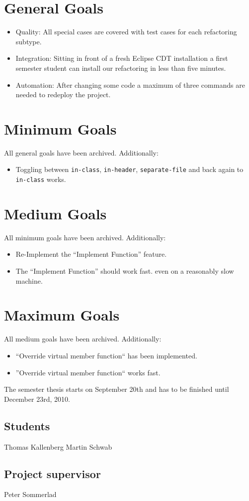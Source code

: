 \documentclass[a4paper,10pt]{scrreprt}
\begin{document}
\pagebreak

\section*{General Goals}

\begin{itemize}
 \item Quality: All special cases are covered with test cases for each
refactoring subtype.
 \item Integration: Sitting in front of a fresh Eclipse CDT installation a first
semester student can install our refactoring in less than five minutes.
 \item Automation: After changing some code a maximum of three commands are
needed to redeploy the project.
\end{itemize}

\section*{Minimum Goals}

All general goals have been archived. Additionally:
\begin{itemize}
 \item Toggling between \texttt{in-class}, \texttt{in-header},
\texttt{separate-file} and back again to \texttt{in-class} works.
\end{itemize}

\section*{Medium Goals}
All minimum goals have been archived. Additionally:
\begin{itemize}
 \item Re-Implement the ``Implement Function'' feature.
 \item The ``Implement Function'' should work fast. even on a reasonably
slow machine. %
\end{itemize}

\section*{Maximum Goals}
All medium goals have been archived. Additionally:
\begin{itemize}
 \item ``Override virtual member function`` has been implemented.
 \item ''Override virtual member function`` works fast.\newline
\end{itemize}

The semester thesis starts on September 20th and has to be finished until
December 23rd, 2010.

\subsection*{Students}
Thomas Kallenberg \dotfill
Martin Schwab \dotfill
\subsection*{Project supervisor}
Peter Sommerlad \dotfill
~ \newline 
\end{document}
